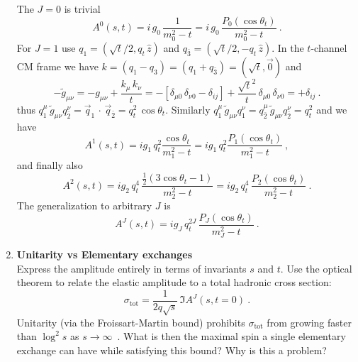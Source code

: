 \begin{enumerate}
          \begin{solution}
              The $J=0$ is trivial
              \begin{equation}
                  A^0(s,t) = i \, g_0 \, \frac{1}{m_0^2 - t} = i \, g_0 \, \frac{P_0(\cos\theta_t)}{m_0^2 - t} ~.
              \end{equation}
              For $J=1$ use $q_1 = (\sqrt{t}/2, q_t \, \hat{z})$ and $q_{\bar{3}} = (\sqrt{t}/2, - q_t \, \hat{z} )$.
              In the $t$-channel CM frame we have $k = (q_1 - q_3) = (q_1 + q_{\bar{3}}) = (\sqrt{t}, \vec{0})$ and
              \begin{equation}
                  -\tilde{g}_{\mu\nu} =  - g_{\mu\nu} + \frac{k_\mu \, k_\nu}{t}
                  =  -\left[\delta_{\mu0} \, \delta_{\nu0} - \delta_{ij} \right] + \frac{\sqrt{t}^2}{t} \, \delta_{\mu0} \, \delta_{\nu0} = +\delta_{ij} ~.
              \end{equation}
              thus $q_1^\mu \, \tilde{g}_{\mu\nu} q_{\bar{2}}^\nu =  \vec{q}_1 \, \cdot \, \vec{q}_{\bar{2}} = q_t^2 \, \cos\theta_t$. Similarly $q_1^\mu \, \tilde{g}_{\mu\nu} q_{1}^\nu =  q_{\bar{2}}^\mu \, \tilde{g}_{\mu\nu} q_{\bar{2}}^\nu  = q_t^2$ and we have
              \begin{equation}
                  A^1(s,t) = i g_1 \, q_t^2 \frac{ \cos\theta_t}{m_1^2 - t} = i g_1 \, q_t^2 \frac{P_1(\cos\theta_t)}{m_1^2 - t} ~,
              \end{equation}
              and finally also
              \begin{equation}
                  A^2(s,t) = i g_2 \, q_t^4 \,\frac{\frac{1}{2}(3 \cos\theta_t - 1)}{m_2^2 - t} =  i g_2 \, q_t^4 \, \frac{ P_2(\cos\theta_t)}{m_2^2 - t} ~.
              \end{equation}
              The generalization to arbitrary $J$ is
              \begin{equation}
                  A^J(s,t) = ig_J \, q_t^{2J} \, \frac{ P_J(\cos\theta_t)}{m_J^2 - t} ~.
              \end{equation}
          \end{solution}

    \item \textbf{Unitarity vs Elementary exchanges} \\
          Express the amplitude entirely in terms of invariants $s$ and $t$. Use the optical theorem to relate the elastic amplitude to a total hadronic cross section:
          \begin{equation}
              \sigma_\text{tot} = \frac{1}{2q\sqrt{s}} \, \Im A^J(s,t=0)~.
          \end{equation}
          Unitarity (via the Froissart-Martin bound) prohibits $\sigma_\text{tot}$ from growing faster than $\log^2 s$ as $s\to\infty$~. What is then the maximal spin a single elementary exchange can have while satisfying this bound? Why is this a problem?


\end{enumerate}
